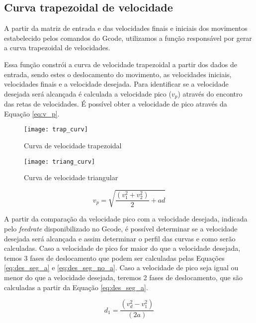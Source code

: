\subsection{Curva trapezoidal de velocidade}

A partir da matriz de entrada e das velocidades finais e iniciais dos movimentos estabelecido pelos comandos do Gcode,
utilizamos a função responsável por gerar a curva trapezoidal de velocidades.

Essa função constrói a curva de velocidade trapezoidal a partir dos dados
de entrada, sendo estes o deslocamento do movimento, as velocidades iniciais, velocidades finais e a velocidade desejada.
Para identificar se a velocidade desejada será alcançada é calculada a velocidade pico ($v_p$) através do encontro das retas de velocidades. É possível obter a velocidade de pico através da Equação \ref{eq:v_p}.

\begin{figure}[H]
    \centering
    \caption{Curva de velocidade trapezoidal}
    \texttt{[image: trap\_curv]}

    \label{fig:trap_curv}
\end{figure}

\begin{figure}[H]
    \centering
    \caption{Curva de velocidade triangular}
    \texttt{[image: triang\_curv]}

    \label{fig:triang_curv}
\end{figure}

\begin{equation}
    \label{eq:v_p}
    v_p = \sqrt{\frac{(v_1^2+v_2^2)}{2}+a d}
\end{equation}

A partir da comparação da velocidade pico com a velocidade desejada, indicada pelo \textit{feedrate} disponibilizado no Gcode,
é possível determinar se a velocidade desejada será alcançada e assim determinar o perfil das curvas e como serão calculadas.
Caso a velocidade de pico for maior do que a velocidade desejada, temos 3 fases de deslocamento
que podem ser calculadas pelas Equações \ref{eq:des_seg_a} e \ref{eq:des_seg_no_a}. Caso a velocidade de pico seja igual ou menor do que a velocidade desejada, teremos 2 fases de deslocamento,
que são calculadas a partir da Equação \ref{eq:des_seg_a}.

\begin{equation}
    \label{eq:des_seg_a}
    d_1 = \frac{(v_d^2-v_1^2)}{(2 a)}
\end{equation}

